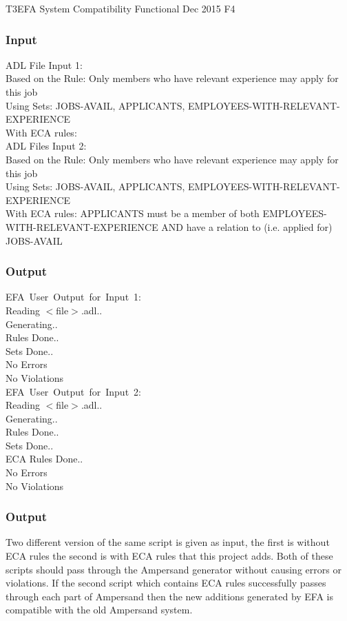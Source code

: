 \documentclass[12pt]{report}
\begin{document}
\systemTest
{T3}{EFA System Compatibility}
{Functional }
{Dec 2015}
{F4}
\vspace{-12pt}\subsubsection*{Input}
ADL File Input 1: \\
	Based on the Rule: Only members who have relevant experience may apply for 
	this 
	job \\
	Using Sets: JOBS-AVAIL, APPLICANTS, EMPLOYEES-WITH-RELEVANT-EXPERIENCE \\
	With ECA rules:\\
	ADL Files Input 2:\\
	Based on the Rule: Only members who have relevant experience may apply for 
	this 
	job \\
	Using Sets: JOBS-AVAIL, APPLICANTS, EMPLOYEES-WITH-RELEVANT-EXPERIENCE \\
	With ECA rules: APPLICANTS must be a member of both 
	EMPLOYEES-WITH-RELEVANT-EXPERIENCE AND have a relation to (i.e. applied 
	for) 
	JOBS-AVAIL \\
	
\vspace{-12pt}\subsubsection*{Output}
EFA\ User\ Output\ for\ Input\ 1: \\
	Reading $<$file$>$.adl.. \\
	Generating.. \\
	Rules Done.. \\
	Sets Done.. \\
	No Errors \\
	No Violations \\
	EFA\ User\ Output\ for\ Input\ 2: \\
	Reading $<$file$>$.adl..\\
	Generating.. \\
	Rules Done.. \\
	Sets Done.. \\
	ECA Rules Done.. \\
	No Errors \\
	No Violations \\
	
\vspace{-12pt}\subsubsection*{Output}
Two different version of the same script is given as input, the first is 
without ECA rules the second is with ECA rules that this project adds. Both of 
these scripts should pass through the Ampersand generator without causing 
errors or violations. If the second script which contains ECA rules 
successfully passes through each part of Ampersand then the new additions 
generated by EFA is compatible with the old Ampersand system.




\end{document}
